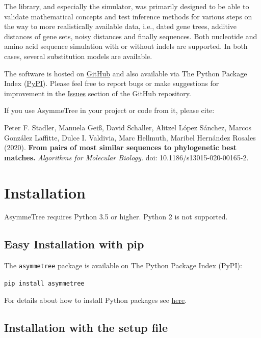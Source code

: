 \documentclass[hidelinks,11pt]{article}
\newcommand{\COMMANDLINE}[1]{\begingroup\par\vspace{3mm}\color{darkgrey}\begin{adjustwidth}{1cm}{1cm}\texttt{#1}\end{adjustwidth}\vspace{3mm}\endgroup}
\begin{document}
The library, and especially the simulator, was primarily designed to be able to validate mathematical concepts and test inference methods for various steps on the way to more realistically available data, i.e., dated gene trees, additive distances of gene sets, noisy distances and finally sequences.
Both nucleotide and amino acid sequence simulation with or without indels are supported. In both cases, several substitution models are available.

The software is hosted on \href{https://github.com/david-schaller/AsymmeTree}{GitHub} and also available via The Python Package Index (\href{https://pypi.org/project/asymmetree/}{PyPI}).
Please feel free to report bugs or make suggestions for improvement in the \href{https://github.com/david-schaller/AsymmeTree/issues}{Issues} section of the GitHub repository.

If you use AsymmeTree in your project or code from it, please cite:

\vspace{3mm}
\begin{adjustwidth}{1cm}{1cm}
	Peter F. Stadler, Manuela Gei{\ss}, David Schaller, Alitzel L{\'o}pez S{\'a}nchez, Marcos Gonz{\'a}lez Laffitte, Dulce I. Valdivia, Marc Hellmuth, Maribel Hern{\'a}ndez Rosales (2020). \textbf{From pairs of most similar sequences to phylogenetic best matches.} \textit{Algorithms for Molecular Biology.} doi: 10.1186/s13015-020-00165-2.
\end{adjustwidth}
\vspace{3mm}


\section{Installation}

AsymmeTree requires Python 3.5 or higher. Python 2 is not supported.

\subsection{Easy Installation with pip}


The \texttt{asymmetree} package is available on The Python Package Index (PyPI):

\COMMANDLINE{pip install asymmetree}

\noindent
For details about how to install Python packages see
\href{https://packaging.python.org/tutorials/installing-packages/}{here}.

\subsection{Installation with the setup file}
\end{document}

